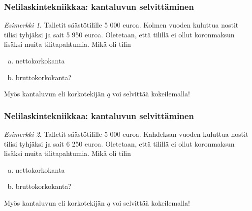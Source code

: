 \documentclass[handout]{beamer}\usepackage[]{graphicx}\usepackage[]{color}
\theoremstyle{remark}
\newtheorem{esim}{Esimerkki}
\begin{document}
\begin{frame}
    \frametitle{Nelilaskintekniikkaa: kantaluvun selvittäminen}
    \begin{esim}
        Talletit säästötilille 5 000 euroa. Kolmen vuoden kuluttua nostit tilisi tyhjäksi ja sait 5 950 euroa.
        Oletetaan, että tilillä ei ollut koronmaksun lisäksi muita tilitapahtumia. Mikä oli tilin
        \begin{enumerate}[(a)]
            \item nettokorkokanta
            \item bruttokorkokanta?
        \end{enumerate}
    \end{esim}
    \pause
    Myös kantaluvun eli korkotekijän $q$ voi selvittää kokeilemalla!
\end{frame}

\begin{frame}
    \frametitle{Nelilaskintekniikkaa: kantaluvun selvittäminen}
    \begin{esim}
        Talletit säästötilille 5 000 euroa. Kahdeksan vuoden kuluttua nostit tilisi tyhjäksi ja sait 6 250 euroa.
        Oletetaan, että tilillä ei ollut koronmaksun lisäksi muita tilitapahtumia. Mikä oli tilin
        \begin{enumerate}[(a)]
            \item nettokorkokanta
            \item bruttokorkokanta?
        \end{enumerate}
    \end{esim}
    \pause
    Myös kantaluvun eli korkotekijän $q$ voi selvittää kokeilemalla!
\end{frame}
\end{document}
